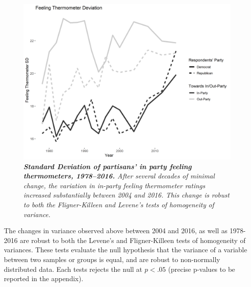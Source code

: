 \documentclass[12pt]{article}
\begin{document}


\begin{figure}[H]
\center\includegraphics[width=5in]{cdf-sd.png}
\caption{\label{fig:cdf-sd} \textit{\textbf{Standard Deviation of partisans' in party feeling thermometers, 1978--2016.} After several decades of minimal change, the variation in in-party feeling thermometer ratings increased substantially between 2004 and 2016. This change is robust to both the Fligner-Killeen and Levene's tests of homogeneity of variance.}}
\end{figure}



The changes in variance observed above between 2004 and 2016, as well as 1978-2016 are robust to both the Levene's and Fligner-Killeen tests of homogeneity of variances. These tests evaluate the null hypothesis that the variance of a variable between two samples or groups is equal, and are robust to non-normally distributed data. Each tests rejects the null at $p<.05$ (precise p-values to be reported in the appendix).


\end{document}
